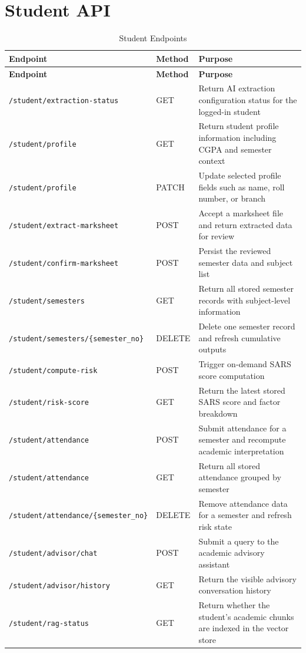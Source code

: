 \section{Student API}
\begin{longtable}{p{}p{}p{}}
\caption{Student Endpoints}\\
\toprule
\textbf{Endpoint} & \textbf{Method} & \textbf{Purpose} \\
\midrule
\endfirsthead
\toprule
\textbf{Endpoint} & \textbf{Method} & \textbf{Purpose} \\
\midrule
\endhead
\texttt{/student/extraction-status} & GET & Return AI extraction configuration status for the logged-in student \\
\texttt{/student/profile} & GET & Return student profile information including CGPA and semester context \\
\texttt{/student/profile} & PATCH & Update selected profile fields such as name, roll number, or branch \\
\texttt{/student/extract-marksheet} & POST & Accept a marksheet file and return extracted data for review \\
\texttt{/student/confirm-marksheet} & POST & Persist the reviewed semester data and subject list \\
\texttt{/student/semesters} & GET & Return all stored semester records with subject-level information \\
\texttt{/student/semesters/\{semester\_no\}} & DELETE & Delete one semester record and refresh cumulative outputs \\
\texttt{/student/compute-risk} & POST & Trigger on-demand SARS score computation \\
\texttt{/student/risk-score} & GET & Return the latest stored SARS score and factor breakdown \\
\texttt{/student/attendance} & POST & Submit attendance for a semester and recompute academic interpretation \\
\texttt{/student/attendance} & GET & Return all stored attendance grouped by semester \\
\texttt{/student/attendance/\{semester\_no\}} & DELETE & Remove attendance data for a semester and refresh risk state \\
\texttt{/student/advisor/chat} & POST & Submit a query to the academic advisory assistant \\
\texttt{/student/advisor/history} & GET & Return the visible advisory conversation history \\
\texttt{/student/rag-status} & GET & Return whether the student's academic chunks are indexed in the vector store \\
\bottomrule
\end{longtable}

